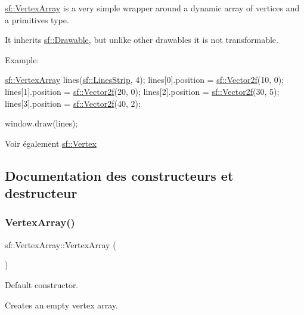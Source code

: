 \hyperlink{classsf_1_1VertexArray}{sf\+::\+Vertex\+Array} is a very simple wrapper around a dynamic array of vertices and a primitives type.

It inherits \hyperlink{classsf_1_1Drawable}{sf\+::\+Drawable}, but unlike other drawables it is not transformable.

Example\+: 
\begin{DoxyCode}
\hyperlink{classsf_1_1VertexArray}{sf::VertexArray} lines(\hyperlink{group__graphics_gga5ee56ac1339984909610713096283b1ba5b09910f5d0f39641342184ccd0d1de3}{sf::LinesStrip}, 4);
lines[0].position = \hyperlink{classsf_1_1Vector2}{sf::Vector2f}(10, 0);
lines[1].position = \hyperlink{classsf_1_1Vector2}{sf::Vector2f}(20, 0);
lines[2].position = \hyperlink{classsf_1_1Vector2}{sf::Vector2f}(30, 5);
lines[3].position = \hyperlink{classsf_1_1Vector2}{sf::Vector2f}(40, 2);

window.draw(lines);
\end{DoxyCode}


\begin{DoxySeeAlso}{Voir également}
\hyperlink{classsf_1_1Vertex}{sf\+::\+Vertex} 
\end{DoxySeeAlso}


\subsection{Documentation des constructeurs et destructeur}
\mbox{\label{classsf_1_1VertexArray_a15729e01df8fc0021f9774dfb56295c1}} 
\subsubsection{\texorpdfstring{Vertex\+Array()}{VertexArray()}\hspace{0.1cm}{\footnotesize\ttfamily [1/2]}}
{\footnotesize\ttfamily sf\+::\+Vertex\+Array\+::\+Vertex\+Array (\begin{DoxyParamCaption}{ }\end{DoxyParamCaption})}



Default constructor. 

Creates an empty vertex array. \mbox{\label{classsf_1_1VertexArray_a4bb1c29a0e3354a035075899d84f02f9}} 
